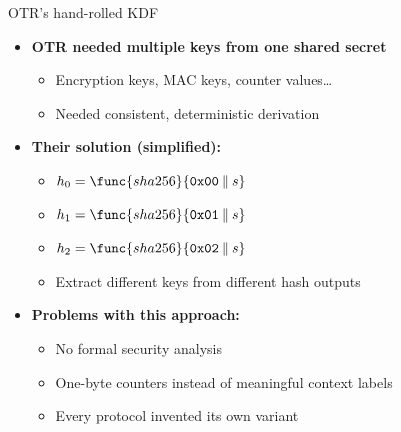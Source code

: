 \ifdefined\PRESENTATION\else\PassOptionsToClass{handout}{beamer}\fi\documentclass[aspectratio=169, lualatex]{beamer}
\begin{document}
\begin{frame}{OTR's hand-rolled KDF}
	\begin{itemize}
		\item \textbf{OTR needed multiple keys from one shared secret}
		      \begin{itemize}
			      \item Encryption keys, MAC keys, counter values\ldots
			      \item Needed consistent, deterministic derivation
		      \end{itemize}
		\item \textbf{Their solution (simplified):}
		      \begin{itemize}
			      \item $h_0 = \func{sha256}{\texttt{0x00} \mathbin{\|} s}$
			      \item $h_1 = \func{sha256}{\texttt{0x01} \mathbin{\|} s}$
			      \item $h_2 = \func{sha256}{\texttt{0x02} \mathbin{\|} s}$
			      \item Extract different keys from different hash outputs
		      \end{itemize}
		\item \textbf{Problems with this approach:}
		      \begin{itemize}
			      \item No formal security analysis
			      \item One-byte counters instead of meaningful context labels
			      \item Every protocol invented its own variant
		      \end{itemize}
	\end{itemize}
\end{frame}
\end{document}
